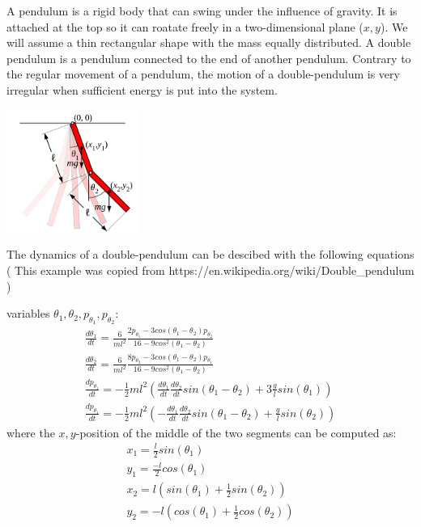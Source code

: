 
A pendulum is a rigid body that can swing under the influence of gravity. It is attached at the top so it can roatate freely in a two-dimensional plane ($x,y$).
We will assume a thin rectangular shape with the mass equally distributed. A double pendulum is a pendulum connected to the end of another pendulum. Contrary to the 
regular movement of a pendulum, the motion of a double-pendulum is very irregular when sufficient energy is put into the system. 

\includegraphics[height=4cm]{Double-compound-pendulum.png}

The dynamics of a double-pendulum can be descibed with the following equations 
( This example was copied from https://en.wikipedia.org/wiki/Double\_pendulum )

variables $\theta_1, \theta_2, p_{\theta_1}, p_{\theta_2}$:
\begin{eqnarray}
   \frac{d \theta_1}{dt}= \frac{6}{m l^2} \frac{2 p_{\theta_1} - 3cos(\theta_1-\theta_2) p_{\theta_2}}
   {16-9 cos^2(\theta_1-\theta_2)}\\
   \frac{d \theta_2}{dt}= \frac{6}{m l^2} \frac{8 p_{\theta_2} - 3cos(\theta_1-\theta_2) p_{\theta_1}}
   {16-9 cos^2(\theta_1-\theta_2)}\\
   \frac{dp_{\theta_1}}{dt} = -\frac{1}{2} ml^2 \left( \frac{d \theta_1}{dt} \frac{d \theta_2}{dt} sin(\theta_1-\theta_2) + 3\frac{g}{l} sin(\theta_1) \right)  \\
   \frac{dp_{\theta_1}}{dt} = -\frac{1}{2} ml^2 \left( -\frac{d \theta_1}{dt} \frac{d \theta_2}{dt} sin(\theta_1-\theta_2) + \frac{g}{l} sin(\theta_2) \right) 
\end{eqnarray}
where the $x,y$-position of the middle of the two segments can be computed as:
\begin{eqnarray}
   x_1 = \frac{l}{2} sin(\theta_1) \\
   y_1 = \frac{-l}{2} cos(\theta_1) \\
   x_2 = l ( sin(\theta_1) + \frac{1}{2} sin(\theta_2) ) \\
   y_2 = -l ( cos(\theta_1) + \frac{1}{2} cos(\theta_2) )
\end{eqnarray}

